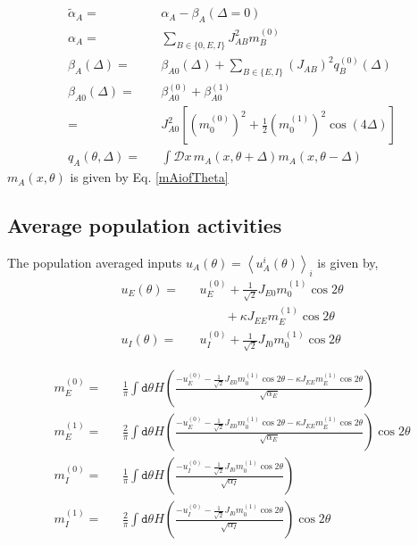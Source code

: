 \begin{eqnarray}
\tilde{\alpha}_A =&& \alpha_A - \beta_A(\Delta = 0) \\ %
\alpha_{A} =&& \sum_{B \in \lbrace 0, E, I \rbrace} J_{AB}^2 m_B^{(0)} \\
\beta_{A}(\Delta) =&&  \beta_{A0} (\Delta) + \sum_{B \in \lbrace E, I \rbrace}  \left(J_{AB}\right)^2 q_B^{(0)}(\Delta) \\
\beta_{A0} (\Delta) =&& \beta_{A0}^{(0)} + \beta_{A0}^{(1)} \nonumber \\
=&& J^2_{A0} \left[ (m_0^{(0)})^2 + \frac{1}{2}(m_0^{(1)})^2  \cos(4\Delta) \right] \\
q_A (\theta, \Delta) =&& \int \mathcal{D} x \,  m_A(x, \theta + \Delta)  m_A(x, \theta - \Delta) 
\end{eqnarray}
$m_A(x, \theta)$ is given by Eq. \ref{mAiofTheta}

\subsection{Average population activities}
The population averaged inputs $u_A(\theta) = \left\langle u_A^i(\theta) \right\rangle_{i}$ is given by,\begin{eqnarray}
u_E(\theta) =&& u^{(0)}_E + \frac{1}{\sqrt{2}} J_{E0} m_0^{(1)} \cos 2 \theta \nonumber \\
\qquad&& \qquad+ \kappa J_{EE} m_E^{(1)} \cos 2 \theta \\
u_I(\theta) =&& u^{(0)}_I + \frac{1}{\sqrt{2}} J_{I0} m_0^{(1)} \cos 2 \theta 
\end{eqnarray}

\begin{widetext}
\begin{eqnarray}
m_E^{(0)} =&& \frac{1}{\pi} \int \mathtt{d} \theta H \left( \frac{-u^{(0)}_E - \frac{1}{\sqrt{2}} J_{E0} m_0^{(1)} \cos 2 \theta - \kappa  J_{EE} m_E^{(1)} \cos 2 \theta}{\sqrt{\alpha_E} } \right)  \label{me0} \\
m_E^{(1)} =&& \frac{2}{\pi} \int \mathtt{d} \theta H \left( \frac{-u^{(0)}_E - \frac{1}{\sqrt{2}} J_{E0} m_0^{(1)} \cos 2 \theta - \kappa  J_{EE} m_E^{(1)} \cos 2 \theta}{\sqrt{\alpha_E} } \right) \cos 2 \theta  \label{me1} \\
m_I^{(0)} =&& \frac{1}{\pi} \int \mathtt{d} \theta H \left( \frac{-u^{(0)}_I - \frac{1}{\sqrt{2}} J_{I0} m_0^{(1)} \cos 2 \theta}{\sqrt{\alpha_I} } \right)  \label{mi0} \\
m_I^{(1)} =&& \frac{2}{\pi} \int \mathtt{d} \theta H \left( \frac{-u^{(0)}_I - \frac{1}{\sqrt{2}} J_{I0} m_0^{(1)} \cos 2 \theta }{\sqrt{\alpha_I} } \right) \cos 2 \theta  \label{mi1}
\end{eqnarray}
\end{widetext}

